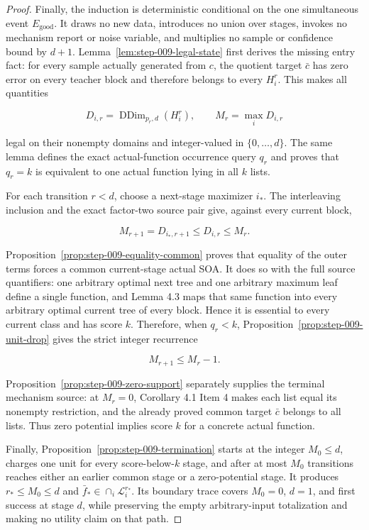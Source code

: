 \begin{proof}
Finally, the induction is deterministic conditional on the one
simultaneous event \(E_{\mathrm{good}}\). It draws no new data, introduces
no union over stages, invokes no mechanism report or noise variable, and
multiplies no sample or confidence bound by \(d+1\). 
Lemma~\ref{lem:step-009-legal-state} first derives the missing entry fact:
for every sample actually generated from \(c\), the quotient target
\(\bar c\) has zero error on every teacher block and therefore belongs to
every \(H_i^r\). This makes all quantities

\[
 D_{i,r}=\operatorname{DDim}_{p_r,d}(H_i^r),
 \qquad M_r=\max_iD_{i,r}
\]

legal on their nonempty domains and integer-valued in
\(\{0,\ldots,d\}\). The same lemma defines the exact actual-function
occurrence query \(q_r\) and proves that \(q_r=k\) is equivalent to one
actual function lying in all \(k\) lists.

For each transition \(r<d\), choose a next-stage maximizer \(i_*\).
The  interleaving inclusion and the exact factor-two source pair
give, against every current block,

\[
 M_{r+1}=D_{i_*,r+1}\le D_{i,r}\le M_r.
\]

Proposition~\ref{prop:step-009-equality-common} proves that equality of the
outer terms forces a common current-stage actual SOA. It does so with the
full source quantifiers: one arbitrary optimal next tree and one arbitrary
maximum leaf define a single function, and Lemma 4.3 maps that same
function into every arbitrary optimal current tree of every block. Hence
it is essential to every current class and has score \(k\). Therefore,
when \(q_r<k\), Proposition~\ref{prop:step-009-unit-drop} gives the strict
integer recurrence

\[
 M_{r+1}\le M_r-1.
\]

Proposition~\ref{prop:step-009-zero-support} separately supplies the
terminal mechanism source: at \(M_r=0\), Corollary 4.1 Item 4 makes each
list equal its nonempty restriction, and the already proved common target
\(\bar c\) belongs to all lists. Thus zero potential implies score \(k\)
for a concrete actual function.

Finally, Proposition~\ref{prop:step-009-termination} starts at the integer
\(M_0\le d\), charges one unit for every score-below-\(k\) stage, and after
at most \(M_0\) transitions reaches either an earlier common stage or a
zero-potential stage. It produces \(r_*\le M_0\le d\) and
\(\bar f_*\in\cap_i\mathcal L_i^{r_*}\). Its boundary trace covers
\(M_0=0\), \(d=1\), and first success at stage \(d\), while preserving the
 empty arbitrary-input totalization and making no utility claim on
that path.


\end{proof}
